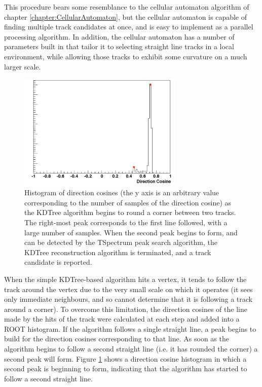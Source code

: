 This procedure bears some resemblance to the cellular automaton algorithm of chapter \ref{chapter:CellularAutomaton}, but the cellular automaton is capable of finding multiple track candidates at once, and is easy to implement as a parallel processing algorithm. In addition, the cellular automaton has a number of parameters built in that tailor it to selecting straight line tracks in a local environment, while allowing those tracks to exhibit some curvature on a much larger scale.

\begin{figure}
    \centering
    \includegraphics[width=0.7\textwidth]{chapters/otheralg_images/kdtree-peaks}
    \caption[Direction cosines around a corner between two tracks]{\label{fig:kdtree_peaks}Histogram of direction cosines (the y axis is an arbitrary value corresponding to the number of samples of the direction cosine) as the KDTree algorithm begins to round a corner between two tracks. The right-most peak corresponds to the first line followed, with a large number of samples. When the second peak begins to form, and can be detected by the TSpectrum peak search algorithm, the KDTree reconstruction algorithm is terminated, and a track candidate is reported.}
\end{figure}

When the simple KDTree-based algorithm hits a vertex, it tends to follow the track around the vertex due to the very small scale on which it operates (it sees only immediate neighbours, and so cannot determine that it is following a track around a corner). To overcome this limitation, the direction cosines of the line made by the hits of the track were calculated at each step and added into a ROOT histogram. If the algorithm follows a single straight line, a peak begins to build for the direction cosines corresponding to that line. As soon as the algorithm begins to follow a second straight line (i.e. it has rounded the corner) a second peak will form. Figure \ref{fig:kdtree_peaks} shows a direction cosine histogram in which a second peak is beginning to form, indicating that the algorithm has started to follow a second straight line.

